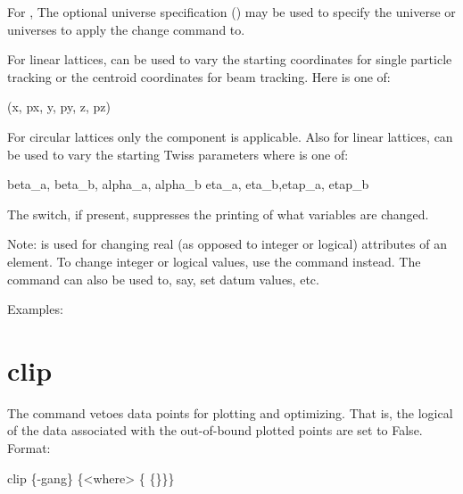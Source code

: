 For , The optional 
universe specification () may be used to specify the
universe or universes to apply the change command to.

For linear lattices,  
can be used to vary the starting coordinates for single particle tracking or the
centroid coordinates for beam tracking. Here  is one of: 
\begin{example}
  (x, px, y, py, z, pz)
\end{example}
For circular lattices only the  component is applicable. 
Also for linear lattices,  can be used to
vary the starting Twiss parameters where  is one of:  
\begin{example}
  beta_a, beta_b, alpha_a, alpha_b 
  eta_a, eta_b,etap_a, etap_b    
\end{example}

The  switch, if present, suppresses the printing of what
variables are changed.

Note:  is used for changing real (as opposed to
integer or logical) attributes of an element. To change integer or
logical values, use the  command instead. The 
command can also be used to, say, set datum values, etc.

Examples:


\section{clip}
\label{s:clip}

The  command vetoes data points for plotting and
optimizing. That is, the  logical of the data
associated with the out-of-bound plotted points are set to False.
Format:
\begin{example}
  clip \{-gang\} \{<where> \{<limit1> \{<limit2>\}\}\}
\end{example}

